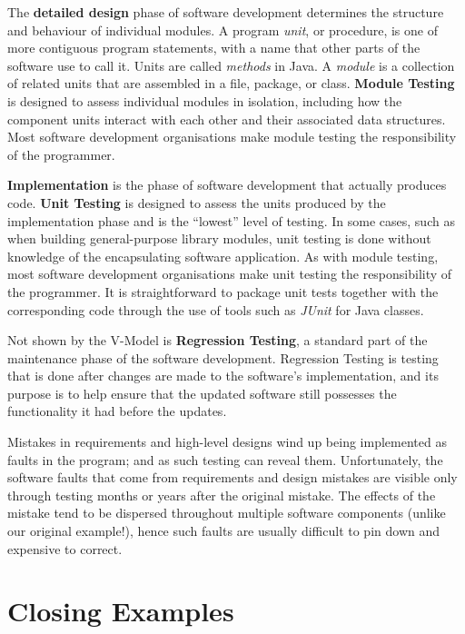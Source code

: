The {\bf detailed design} phase of software development determines the structure
and behaviour of individual modules. A program {\it unit}, or procedure, is one
of more contiguous program statements, with a name that other parts of the
software use to call it. Units are called {\it methods} in Java.
A {\it module} is a collection of related units that are assembled in a file,
package, or class. {\bf Module Testing} is designed to assess individual modules
in isolation, including how the component units interact with each other and
their associated data structures. Most software development organisations make
module testing the responsibility of the programmer. 

{\bf Implementation} is the phase of software development that actually produces
code. {\bf Unit Testing} is designed to assess the units produced by the
implementation phase and is the ``lowest'' level of testing. In some cases, such
as when building general-purpose library modules, unit testing is done without
knowledge of the encapsulating software application. As with module testing,
most software development organisations make unit testing the responsibility of
the programmer. 
%
It is straightforward to package unit tests together with the corresponding
code through the use of tools such as {\it JUnit} for Java classes.


Not shown by the V-Model is {\bf Regression Testing}, a standard part of the
maintenance phase of the software development. Regression Testing is testing
that is done after changes are made to the software's implementation, and its
purpose is to help ensure that the updated software still possesses the
functionality it had before the updates. 


Mistakes in requirements and high-level designs wind up being implemented as
faults in the program; and as such testing can reveal them. Unfortunately, the
software faults that come from requirements and design mistakes are visible only
through testing months or years after the original mistake. The effects of the
mistake tend to be dispersed throughout multiple software components (unlike our
original example!), hence such faults are usually difficult to pin down and
expensive to correct. 

\section{Closing Examples}

